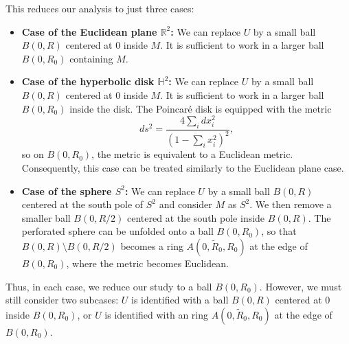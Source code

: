 \documentclass[leqno,11pt,letterpaper, english]{amsart}
\theoremstyle{plain}
\theoremstyle{definition}
\numberwithin{equation}{section}
\begin{document}
This reduces our analysis to just three cases:
\begin{itemize}
    \item \textbf{Case of the Euclidean plane \( \mathbb{R}^2 \):}
      We can replace \( U \) by a small ball \( B(0, R) \) centered at \( 0 \) inside \( M \). 
      It is sufficient to work in a larger ball \( B(0, R_0) \) containing \( M \).

    \item \textbf{Case of the hyperbolic disk \( \mathbb{H}^2 \):}
      We can replace \( U \) by a small ball \( B(0, R) \) centered at \( 0 \) inside \( M \).
      It is sufficient to work in a larger ball \( B(0, R_0) \) inside the disk. The Poincar\'e disk is equipped with the metric
      \begin{equation}
          ds^2 = \frac{4 \sum_i dx_i^2}{(1 - \sum_i x_i^2)^2},
      \end{equation}
      so on \( B(0, R_0) \), the metric is equivalent to a Euclidean metric. Consequently, this case can be treated similarly to the Euclidean plane case.

    \item \textbf{Case of the sphere \( S^2 \):}
      We can replace \( U \) by a small ball \( B(0, R) \) centered at the south pole of \( S^2 \) and consider \( M \) as \( S^2 \). 
      We then remove a smaller ball \( B(0, R/2) \) centered at the south pole inside \( B(0, R) \). 
      The perforated sphere can be unfolded onto a ball \( B(0, R_0) \), so that \( B(0, R) \setminus B(0, R/2) \) becomes a ring \( A(0, \tilde{R}_0, R_0) \) at the edge of \( B(0, R_0) \), where the metric becomes Euclidean.
\end{itemize}

Thus, in each case, we reduce our study to a ball \( B(0, R_0) \). However, we must still consider two subcases: \( U \) is identified with a ball \( B(0, R) \) centered at \( 0 \) inside \( B(0, R_0) \), or \( U \) is identified with an ring \( A(0, \tilde{R}_0, R_0) \) at the edge of \( B(0, R_0) \). 



\end{document}
